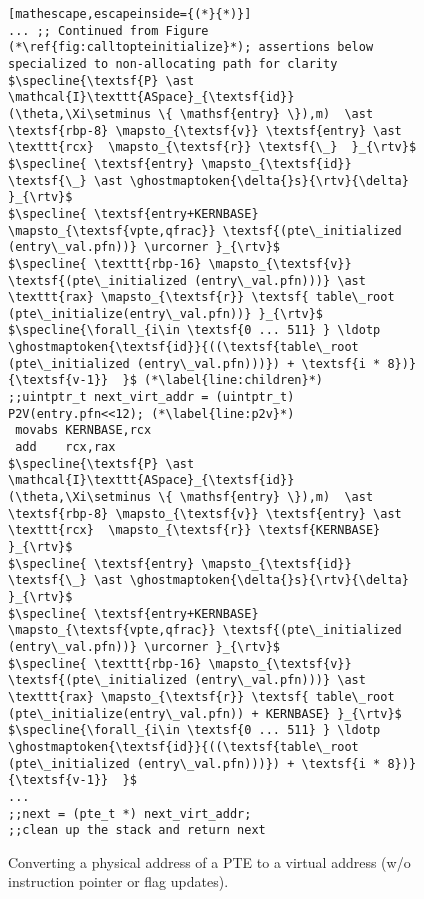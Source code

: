 \begin{figure}\footnotesize
\begin{lstlisting}[mathescape,escapeinside={(*}{*)}]
... ;; Continued from Figure (*\ref{fig:calltopteinitialize}*); assertions below specialized to non-allocating path for clarity
$\specline{\textsf{P} \ast \mathcal{I}\texttt{ASpace}_{\textsf{id}}(\theta,\Xi\setminus \{ \mathsf{entry} \}),m)  \ast \textsf{rbp-8} \mapsto_{\textsf{v}} \textsf{entry} \ast \texttt{rcx}  \mapsto_{\textsf{r}} \textsf{\_}  }_{\rtv}$
$\specline{ \textsf{entry} \mapsto_{\textsf{id}} \textsf{\_} \ast \ghostmaptoken{\delta{}s}{\rtv}{\delta}  }_{\rtv}$
$\specline{ \textsf{entry+KERNBASE} \mapsto_{\textsf{vpte,qfrac}} \textsf{(pte\_initialized (entry\_val.pfn))} \urcorner }_{\rtv}$
$\specline{ \texttt{rbp-16} \mapsto_{\textsf{v}} \textsf{(pte\_initialized (entry\_val.pfn)))} \ast \texttt{rax} \mapsto_{\textsf{r}} \textsf{ table\_root (pte\_initialize(entry\_val.pfn))} }_{\rtv}$
$\specline{\forall_{i\in \textsf{0 ... 511} } \ldotp  \ghostmaptoken{\textsf{id}}{((\textsf{table\_root (pte\_initialized (entry\_val.pfn)))}) + \textsf{i * 8})}{\textsf{v-1}}  }$ (*\label{line:children}*)
;;uintptr_t next_virt_addr = (uintptr_t) P2V(entry.pfn<<12); (*\label{line:p2v}*) 
 movabs KERNBASE,rcx
 add    rcx,rax
$\specline{\textsf{P} \ast \mathcal{I}\texttt{ASpace}_{\textsf{id}}(\theta,\Xi\setminus \{ \mathsf{entry} \}),m)  \ast \textsf{rbp-8} \mapsto_{\textsf{v}} \textsf{entry} \ast \texttt{rcx}  \mapsto_{\textsf{r}} \textsf{KERNBASE} }_{\rtv}$
$\specline{ \textsf{entry} \mapsto_{\textsf{id}} \textsf{\_} \ast \ghostmaptoken{\delta{}s}{\rtv}{\delta}  }_{\rtv}$
$\specline{ \textsf{entry+KERNBASE} \mapsto_{\textsf{vpte,qfrac}} \textsf{(pte\_initialized (entry\_val.pfn))} \urcorner }_{\rtv}$
$\specline{ \texttt{rbp-16} \mapsto_{\textsf{v}} \textsf{(pte\_initialized (entry\_val.pfn)))} \ast \texttt{rax} \mapsto_{\textsf{r}} \textsf{ table\_root (pte\_initialize(entry\_val.pfn)) + KERNBASE} }_{\rtv}$
$\specline{\forall_{i\in \textsf{0 ... 511} } \ldotp  \ghostmaptoken{\textsf{id}}{((\textsf{table\_root (pte\_initialized (entry\_val.pfn)))}) + \textsf{i * 8})}{\textsf{v-1}}  }$
...
;;next = (pte_t *) next_virt_addr;
;;clean up the stack and return next
\end{lstlisting}
\vspace{-1em}
\caption{Converting a physical address of a PTE to a virtual address (w/o instruction pointer or flag updates).
}
\label{fig:p2v}
\end{figure}
